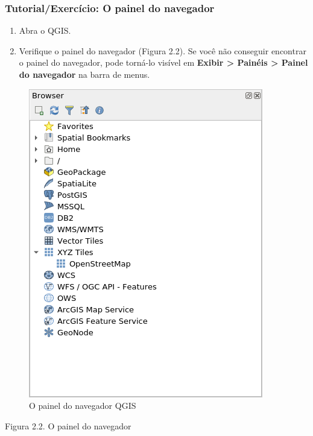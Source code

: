 \documentclass[
]{krantz}
\providecommand{\tightlist}{%
  \setlength{\itemsep}{0pt}\setlength{\parskip}{0pt}}
\begin{document}
\hypertarget{tutorialexercuxedcio-o-painel-do-navegador}{%
\subsubsection{Tutorial/Exercício: O painel do navegador}\label{tutorialexercuxedcio-o-painel-do-navegador}}

\begin{enumerate}
\def\labelenumi{\arabic{enumi}.}
\tightlist
\item
  Abra o QGIS.
\item
  Verifique o painel do navegador (Figura 2.2). Se você não conseguir encontrar o painel do navegador, pode torná-lo visível em \textbf{Exibir \textgreater{} Painéis \textgreater{} Painel do navegador} na barra de menus.
\end{enumerate}

\begin{figure}
\centering
\includegraphics{media/modulo2/qgis-browser-1.png}
\caption{O painel do navegador QGIS}
\end{figure}

Figura 2.2. O painel do navegador
\end{document}
